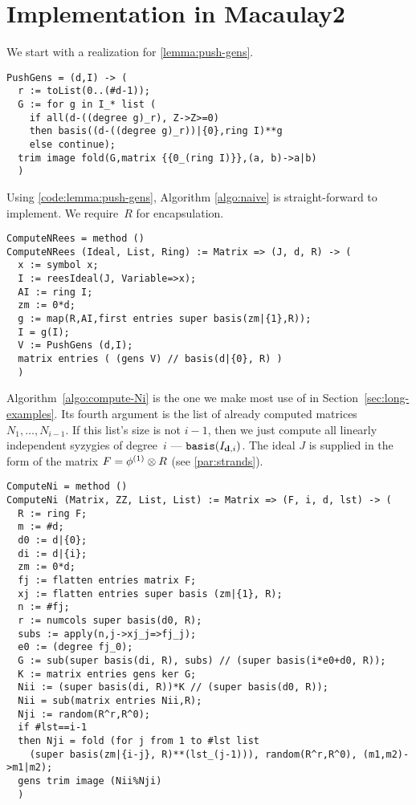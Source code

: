 \documentclass[fleqn,reqno]{amsart}
\begin{document}
\section{Implementation in Macaulay2}
\label{sec:implementation}

\begin{paragraf}
\label{code:lemma:push-gens}
We start with a realization for \eqref{lemma:push-gens}.
\label{code:lemma:push-gens}
\begin{verbatim}
PushGens = (d,I) -> (
  r := toList(0..(#d-1));
  G := for g in I_* list (
    if all(d-((degree g)_r), Z->Z>=0)
    then basis((d-((degree g)_r))|{0},ring I)**g
    else continue);
  trim image fold(G,matrix {{0_(ring I)}},(a, b)->a|b)
  )
\end{verbatim}
\end{paragraf}

\begin{paragraf}
\label{code:algo:naive}
Using \eqref{code:lemma:push-gens},
Algorithm \ref{algo:naive} is straight-forward to implement.
We require~$R$ for encapsulation.
\begin{verbatim}
ComputeNRees = method ()
ComputeNRees (Ideal, List, Ring) := Matrix => (J, d, R) -> (
  x := symbol x;
  I := reesIdeal(J, Variable=>x);
  AI := ring I;
  zm := 0*d;
  g := map(R,AI,first entries super basis(zm|{1},R));
  I = g(I);
  V := PushGens (d,I);
  matrix entries ( (gens V) // basis(d|{0}, R) )
  )
\end{verbatim}
\end{paragraf}

\begin{paragraf}
\label{code:algo:compute-Ni}
Algorithm~\ref{algo:compute-Ni} is the one we make most use of in Section~\ref{sec:long-examples}.
Its fourth argument is the list of already computed matrices $N_1,\ldots,N_{i-1}$.
If this list's size is not $i-1$,
then we just compute all linearly independent syzygies of degree~$i$ --- $\mathop{\tt basis}(I_{\mathbf d,i})$.
The ideal $J$ is supplied in the form of the matrix
$F=\phi^{(1)}\otimes R$ (see \ref{par:strands}).
\begin{verbatim}
ComputeNi = method ()
ComputeNi (Matrix, ZZ, List, List) := Matrix => (F, i, d, lst) -> (
  R := ring F;
  m := #d;
  d0 := d|{0};
  di := d|{i};
  zm := 0*d;
  fj := flatten entries matrix F;
  xj := flatten entries super basis (zm|{1}, R);
  n := #fj;
  r := numcols super basis(d0, R);
  subs := apply(n,j->xj_j=>fj_j);
  e0 := (degree fj_0);
  G := sub(super basis(di, R), subs) // (super basis(i*e0+d0, R));
  K := matrix entries gens ker G;
  Nii := (super basis(di, R))*K // (super basis(d0, R));
  Nii = sub(matrix entries Nii,R);
  Nji := random(R^r,R^0);
  if #lst==i-1
  then Nji = fold (for j from 1 to #lst list
    (super basis(zm|{i-j}, R)**(lst_(j-1))), random(R^r,R^0), (m1,m2)->m1|m2);
  gens trim image (Nii%Nji)
  )
\end{verbatim}
\end{paragraf}
\end{document}
